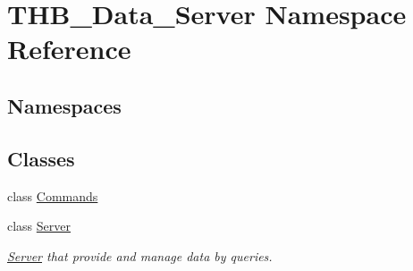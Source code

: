 \hypertarget{namespace_t_h_b___data___server}{}\section{T\+H\+B\+\_\+\+Data\+\_\+\+Server Namespace Reference}
\label{namespace_t_h_b___data___server}
\subsection*{Namespaces}
\begin{DoxyCompactItemize}
\end{DoxyCompactItemize}
\subsection*{Classes}
\begin{DoxyCompactItemize}
\item 
class \mbox{\hyperlink{class_t_h_b___data___server_1_1_commands}{Commands}}
\item 
class \mbox{\hyperlink{class_t_h_b___data___server_1_1_server}{Server}}
\begin{DoxyCompactList}\small\item\em \mbox{\hyperlink{class_t_h_b___data___server_1_1_server}{Server}} that provide and manage data by queries. \end{DoxyCompactList}\end{DoxyCompactItemize}
